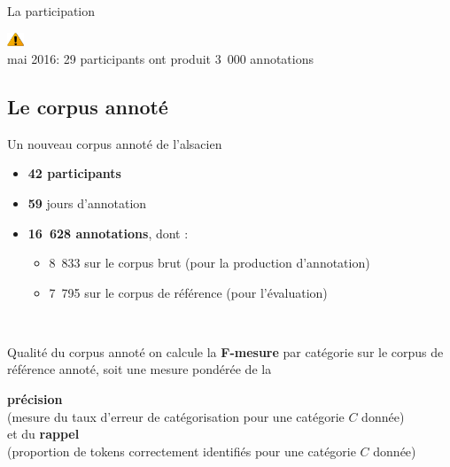 \documentclass[french]{beamer}
\begin{document}
\begin{frame}{La participation}
\begin{figure}[h!tbp]
\begin{center}
    \end{center}
  \end{figure}
  \vspace{-1.8cm}
  \hfill \includegraphics[width=0.5cm]{figures/caution.png} \\
  \bigskip
      \small mai 2016:  \small 29 participants ont produit 3~000 annotations \\
      \bigskip
\end{frame}

\subsection{Le corpus annoté}

\begin{frame}{Un nouveau corpus annoté de l'alsacien}
    \begin{itemize}
    \item \textbf{42 participants}
    \item \textbf{59} jours d'annotation
    \item \textbf{16~628 annotations}, dont :
      \begin{itemize}
        \item 8~833 sur le corpus brut (pour la production d'annotation)
        \item<2-> 7~795 sur le corpus de référence (pour l'évaluation)
      \end{itemize}
      \end{itemize}
    \\
\end{frame}

\begin{frame}{Qualité du corpus annoté}
  \centering
  on calcule la \textbf{F-mesure} par catégorie sur le corpus de référence annoté, soit une mesure pondérée de la

  \textbf{précision} \\ \footnotesize (mesure du taux d'erreur de catégorisation pour une catégorie $C$ donnée) \\ \normalsize et du \textbf{rappel} \\ \footnotesize (proportion de tokens correctement identifiés pour une catégorie $C$ donnée)
\end{frame}
\end{document}
